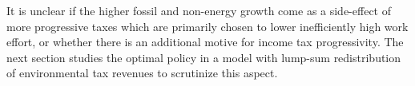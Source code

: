  It is unclear if the higher fossil and non-energy growth come as a side-effect of more progressive taxes which are primarily chosen to lower inefficiently high work effort, or whether there is an additional motive for income tax progressivity. The next section studies the optimal policy in a model with lump-sum redistribution of environmental tax revenues to scrutinize this aspect.

